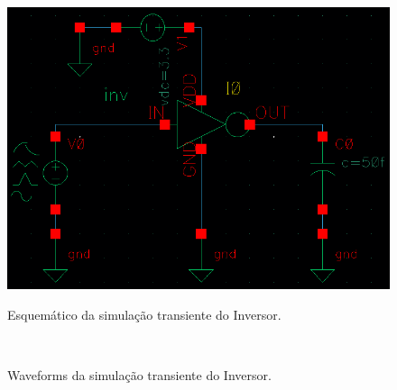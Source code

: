 \documentclass{iiufrgs}
\begin{document}
\begin{figure}[htbp]
    \centering
    \caption{Esquemático da simulação transiente do Inversor.}
    \includegraphics[scale=0.6]{images/schem_inv_trans.png}
    \label{fig:inv_trans}
\end{figure}

\begin{figure}[htbp]
    \centering
    \caption{Waveforms da simulação transiente do Inversor.}
    \label{fig:inv_wave}
     \\
\end{figure}
\end{document}
